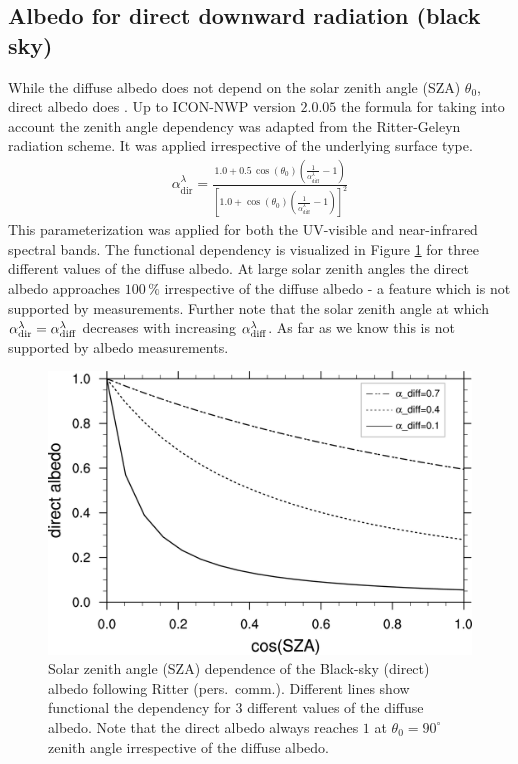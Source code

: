 \documentclass[a4paper,11pt]{article}
\begin{document}
\subsection{Albedo for direct downward radiation (black sky)}
While the diffuse albedo does not depend on the solar zenith angle (SZA) $\theta_{0}$, direct albedo does \citep{Yang:2008}. 
Up to ICON-NWP version $2.0.05$ the formula for taking into account the zenith angle dependency was adapted from 
the Ritter-Geleyn radiation scheme. It was applied irrespective of the underlying surface type.
\begin{align}
  \alpha_{\mathrm{dir}}^{\lambda} = \frac{1.0 + 0.5\, \cos(\theta_{0})  \left(\frac{1}{\alpha_{\mathrm{diff}}^{\lambda}}-1\right)}
                              {\left[1.0 + \cos(\theta_{0})  \left(\frac{1}{\alpha_{\mathrm{diff}}^{\lambda}}-1\right)\right]^{2}} \label{eq:albdir_rg}
\end{align}
This parameterization was applied for both the UV-visible and near-infrared spectral bands. The functional dependency 
is visualized in Figure \ref{fig:albdir_ritter} for three different values of the diffuse albedo. At large solar zenith angles the 
direct albedo approaches $100\,\%$ irrespective of the diffuse albedo - a feature which is not supported by measurements.
Further note that the solar zenith angle at which $\alpha_{\rm dir}^{\lambda}=\alpha_{\rm diff}^{\lambda}$ decreases with increasing 
$\alpha_{\rm diff}^{\lambda}$. As far as we know this is not supported by albedo measurements.
\begin{figure}[hbt]
  \centering
  \includegraphics[width=12.0cm]{direct_albedo_Ritter.png}
  \caption{Solar zenith angle (SZA) dependence of the Black-sky (direct) albedo following Ritter (pers.\ comm.). Different lines 
  show functional the dependency for $3$ different values of the diffuse albedo. Note that the direct 
  albedo always reaches $1$ at $\theta_{0}=90^{\circ}$ zenith angle irrespective of the diffuse albedo.}\label{fig:albdir_ritter}
\end{figure}
\end{document}
